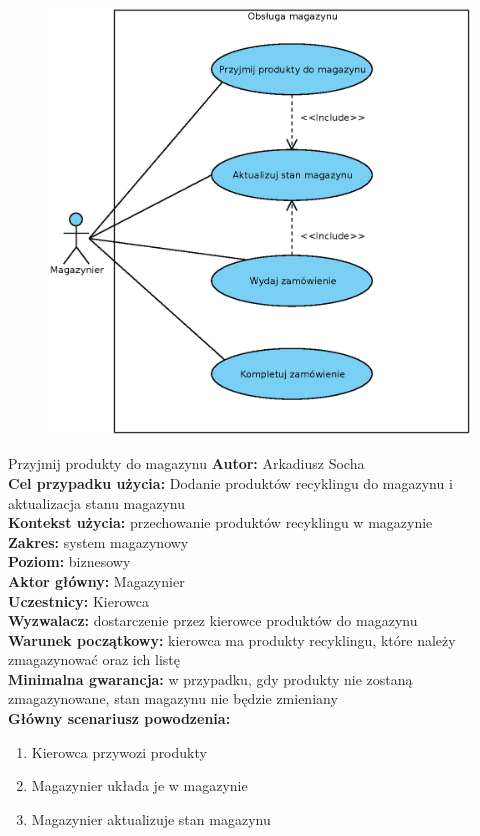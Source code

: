	\begin{figure}[H]
		\centering
		\includegraphics[width=.8\textwidth]{img/UC/magazyn.eps}
	\end{figure}

	\begin{usecase}{Przyjmij produkty do magazynu}
		\textbf{Autor:} Arkadiusz Socha\\
		\textbf{Cel przypadku użycia:} Dodanie produktów recyklingu do magazynu i aktualizacja stanu magazynu \\
		\textbf{Kontekst użycia:} przechowanie produktów recyklingu w magazynie\\
		\textbf{Zakres:} system magazynowy \\
		\textbf{Poziom:} biznesowy \\
		\textbf{Aktor główny:} Magazynier \\
		\textbf{Uczestnicy:} Kierowca \\
		\textbf{Wyzwalacz:} dostarczenie przez kierowce produktów do magazynu \\
		\textbf{Warunek początkowy:} kierowca ma produkty recyklingu, które należy zmagazynować oraz ich listę \\
		\textbf{Minimalna gwarancja:} w przypadku, gdy produkty nie zostaną zmagazynowane, stan magazynu nie będzie zmieniany \\
		\textbf{Główny scenariusz powodzenia:} \\
			\begin{enumerate}
				\item Kierowca przywozi produkty
				\item Magazynier układa je w magazynie
				\item Magazynier aktualizuje stan magazynu
			\end{enumerate}
	\end{usecase}

